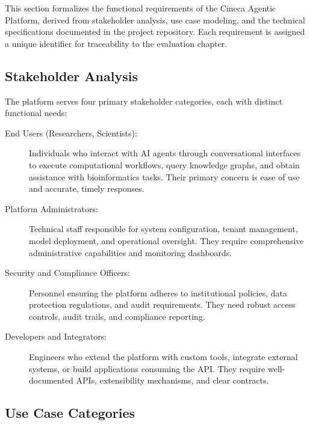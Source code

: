 \documentclass[a4paper,twoside]{sapthesis}
\begin{document}
This section formalizes the functional requirements of the Cineca Agentic Platform, derived from stakeholder analysis, use case modeling, and the technical specifications documented in the project repository. Each requirement is assigned a unique identifier for traceability to the evaluation chapter.

\subsection{Stakeholder Analysis}
\label{subsec:stakeholders}

The platform serves four primary stakeholder categories, each with distinct functional needs:

\begin{description}
    \item[End Users (Researchers, Scientists):] Individuals who interact with AI agents through conversational interfaces to execute computational workflows, query knowledge graphs, and obtain assistance with bioinformatics tasks. Their primary concern is ease of use and accurate, timely responses.
    
    \item[Platform Administrators:] Technical staff responsible for system configuration, tenant management, model deployment, and operational oversight. They require comprehensive administrative capabilities and monitoring dashboards.
    
    \item[Security and Compliance Officers:] Personnel ensuring the platform adheres to institutional policies, data protection regulations, and audit requirements. They need robust access controls, audit trails, and compliance reporting.
    
    \item[Developers and Integrators:] Engineers who extend the platform with custom tools, integrate external systems, or build applications consuming the API. They require well-documented APIs, extensibility mechanisms, and clear contracts.
\end{description}

\subsection{Use Case Categories}
\label{subsec:use-case-categories}
\end{document}
